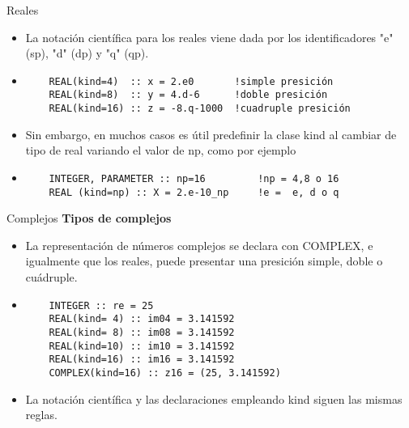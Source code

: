 \begin{frame}[fragile]{Reales}
 \begin{itemize}[<+(0)->]
  \item La notación científica para los reales viene dada por los identificadores "e" (sp), "d" (dp) y "q" (qp).  
  \vspace{0.2cm}
  \item []
   \begin{verbatim}
    REAL(kind=4)  :: x = 2.e0       !simple presición
    REAL(kind=8)  :: y = 4.d-6      !doble presición
    REAL(kind=16) :: z = -8.q-1000  !cuadruple presición
   \end{verbatim}
  \item Sin embargo, en muchos casos es útil predefinir la clase kind al cambiar de tipo de real variando el valor de np, como por ejemplo 
  \vspace{0.2cm}
  \item []
   \begin{verbatim}
    INTEGER, PARAMETER :: np=16         !np = 4,8 o 16
    REAL (kind=np) :: X = 2.e-10_np     !e =  e, d o q
   \end{verbatim}
 \end{itemize}
\end{frame}


\begin{frame}[fragile]{Complejos}
\textbf{Tipos de complejos}
 \begin{itemize}[<+(1)->]
  \item La representación de números complejos se declara con COMPLEX, e igualmente que los reales, puede presentar una presición simple, doble o cuádruple.
  \vspace{0.2cm}
  \item []
   \begin{verbatim}
    INTEGER :: re = 25
    REAL(kind= 4) :: im04 = 3.141592
    REAL(kind= 8) :: im08 = 3.141592
    REAL(kind=10) :: im10 = 3.141592
    REAL(kind=16) :: im16 = 3.141592
    COMPLEX(kind=16) :: z16 = (25, 3.141592)
   \end{verbatim}
  \item La notación científica y las declaraciones empleando kind siguen las mismas reglas.
 \end{itemize}
\end{frame}